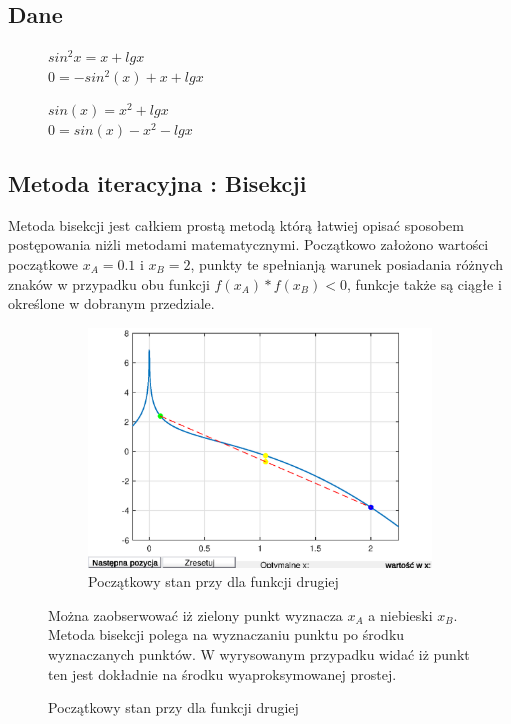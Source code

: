 \documentclass{article}
\begin{document}
\subsection{Dane}

\begin{figure}[H]
\begin{multicols}{2}
    $sin^2 x = x + lg x$\\
    $0 = - sin^2(x) + x + lg x $
    \par
    $sin(x) = x^2 + lg x$\\
    $0 = sin(x) - x^2 - lg x$
\end{multicols}
\end{figure}
\subsection{Metoda iteracyjna : Bisekcji}
Metoda bisekcji jest całkiem prostą metodą którą łatwiej opisać sposobem postępowania niżli metodami matematycznymi.
Początkowo założono wartości początkowe $x_A = 0.1$ i $x_B = 2$, punkty te spełnianją warunek posiadania różnych znaków w przypadku obu funkcji $f(x_A)*f(x_B) < 0$, funkcje także są ciągłe i określone w dobranym przedziale.
\begin{figure}[H]
    \begin{multicols}{2}
        \begin{figure}[H]
            \centering
            \includegraphics[width=\linewidth]{img/Bisection.eps}
        \caption{Początkowy stan przy dla funkcji drugiej}
            \label{fig:my_label}
        \end{figure}
        \par
        \null \vfill
        Można zaobserwować iż zielony punkt wyznacza $x_A$ a niebieski $x_B$. Metoda bisekcji polega na wyznaczaniu punktu po środku wyznaczanych punktów. W wyrysowanym przypadku widać iż punkt ten jest dokładnie na środku wyaproksymowanej prostej. 
        \vfill \null
    \end{multicols}
\end{figure}
\end{document}
